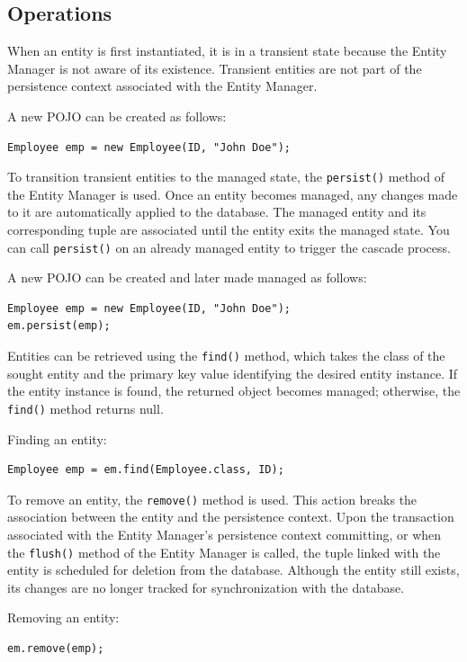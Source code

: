 \subsection{Operations}
When an entity is first instantiated, it is in a transient state because the Entity Manager is not aware of its existence. 
Transient entities are not part of the persistence context associated with the Entity Manager.
\begin{example}
    A new POJO can be created as follows:
\begin{lstlisting}[style=Java]
Employee emp = new Employee(ID, "John Doe"); 
\end{lstlisting}
\end{example}
To transition transient entities to the managed state, the \texttt{persist()} method of the Entity Manager is used. 
Once an entity becomes managed, any changes made to it are automatically applied to the database. 
The managed entity and its corresponding tuple are associated until the entity exits the managed state.
You can call \texttt{persist()} on an already managed entity to trigger the cascade process.
\begin{example}
    A new POJO can be created and later made managed as follows:
\begin{lstlisting}[style=Java]
Employee emp = new Employee(ID, "John Doe"); 
em.persist(emp);
\end{lstlisting}
\end{example}
Entities can be retrieved using the \texttt{find()} method, which takes the class of the sought entity and the primary key value identifying the desired entity instance. 
If the entity instance is found, the returned object becomes managed; otherwise, the \texttt{find()} method returns null.
\begin{example}
    Finding an entity: 
\begin{lstlisting}[style=Java]
Employee emp = em.find(Employee.class, ID);
\end{lstlisting}
\end{example}
To remove an entity, the \texttt{remove()} method is used.
This action breaks the association between the entity and the persistence context. 
Upon the transaction associated with the Entity Manager's persistence context committing, or when the \texttt{flush()} method of the Entity Manager is called, the tuple linked with the entity is scheduled for deletion from the database. 
Although the entity still exists, its changes are no longer tracked for synchronization with the database.
\begin{example}
    Removing an entity:
\begin{lstlisting}[style=Java]
em.remove(emp);
\end{lstlisting}
\end{example}
